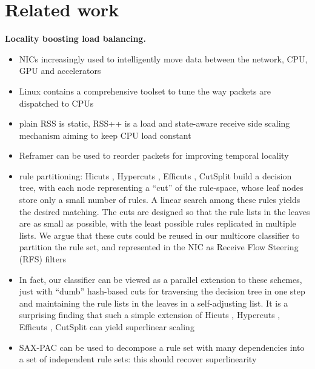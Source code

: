 \section{Related work}
\label{sec:related-work}

\noindent%
\textbf{Locality boosting load balancing.} %
\begin{itemize}
\item NICs increasingly used to intelligently move data between the network, CPU, GPU and accelerators \cite{sherry-ccr23}
\item Linux contains a comprehensive toolset to tune the way packets are dispatched to CPUs \cite{rss-linux}
\item plain RSS is static, RSS++ is a load and state-aware receive side scaling mechanism aiming to keep CPU load constant \cite{10.1145/3359989.3365412}
\item Reframer can be used to reorder packets for improving temporal locality \cite{276946,246322}
\item rule partitioning: Hicuts \cite{820051}, Hypercuts \cite{10.1145/863955.863980}, Efficuts \cite{10.1145/1851182.1851208}, CutSplit \cite{8485947} build a decision tree, with each node representing a ``cut'' of the rule-space, whose leaf nodes store only a small number of rules. A linear search among these rules yields the desired matching. The cuts are designed so that the rule lists in the leaves are as small as possible, with the least possible rules replicated in multiple lists. We argue that these cuts could be reused in our multicore classifier to partition the rule set, and represented in the NIC as Receive Flow Steering (RFS) filters
\item In fact, our classifier can be viewed as a parallel extension to these schemes, just with ``dumb'' hash-based cuts for traversing the decision tree in one step and maintaining the rule lists in the leaves in a self-adjusting list. It is a surprising finding that such a simple extension of Hicuts \cite{820051}, Hypercuts \cite{10.1145/863955.863980}, Efficuts \cite{10.1145/1851182.1851208}, CutSplit \cite{8485947} can yield superlinear scaling
\item SAX-PAC \cite{10.1145/2619239.2626294} can be used to decompose a rule set with many dependencies into a set of independent rule sets: this should recover superlinearity
\end{itemize}

